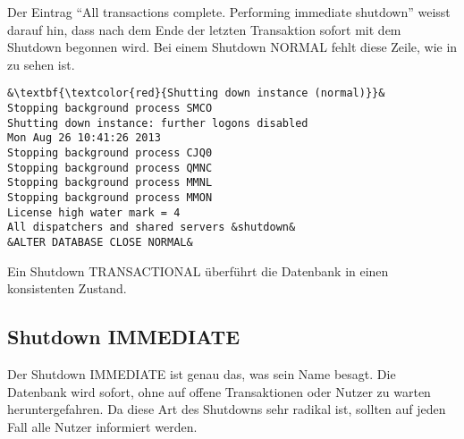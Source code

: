         Der Eintrag \enquote{All transactions complete. Performing immediate shutdown} weisst darauf hin, dass nach dem Ende der letzten Transaktion sofort mit dem Shutdown begonnen wird. Bei einem Shutdown NORMAL fehlt diese Zeile, wie in  zu sehen ist.
        \begin{lstlisting}[caption={Der Shutdown NORMAL im Alert Log},label=admin11,language=terminal]
&\textbf{\textcolor{red}{Shutting down instance (normal)}}&
Stopping background process SMCO
Shutting down instance: further logons disabled
Mon Aug 26 10:41:26 2013
Stopping background process CJQ0
Stopping background process QMNC
Stopping background process MMNL
Stopping background process MMON
License high water mark = 4
All dispatchers and shared servers &shutdown&
&ALTER DATABASE CLOSE NORMAL&
       \end{lstlisting}
       \begin{merke}
        Ein Shutdown TRANSACTIONAL \"uberf\"uhrt die Datenbank in einen konsistenten Zustand.
       \end{merke}
      \subsection{Shutdown IMMEDIATE}
        Der Shutdown IMMEDIATE ist genau das, was sein Name besagt. Die Datenbank wird sofort, ohne auf offene Transaktionen oder Nutzer zu warten heruntergefahren. Da diese Art des Shutdowns sehr radikal ist, sollten auf jeden Fall alle Nutzer informiert werden.


